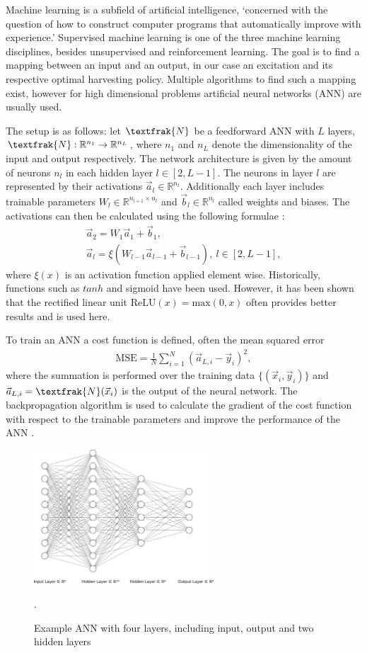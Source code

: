 Machine learning is a subfield of artificial intelligence, `concerned with the question of how to construct computer programs that automatically improve with experience.' \cite{Mitchell97}
Supervised machine learning is one of the three machine learning disciplines, besides unsupervised and reinforcement learning.
The goal is to find a mapping between an input and an output, in our case an excitation and its respective optimal harvesting policy.
Multiple algorithms to find such a mapping exist, however for high dimensional problems artificial neural networks (ANN) are usually used.

The setup is as follows: let $\textfrak{N}$ be a feedforward ANN with $L$ layers, $\textfrak{N}: \mathbb{R}^{n_1} \to \mathbb{R}^{n_L}$, where $n_1$ and $n_L$ denote the dimensionality of the input and output respectively.
The network architecture is given by the amount of neurons $n_l$ in each hidden layer $l \in [2, L - 1]$.
The neurons in layer $l$ are represented by their activations $\vec{a}_l \in \mathbb{R}^{n_l}$. Additionally each layer includes trainable parameters $W_l \in \mathbb{R}^{n_{l+1} \times n_{l}}$ and $\vec{b}_l \in \mathbb{R}^{n_l}$ called weights and biases.
The activations can then be calculated using the following formulae \cite{TN_libero_mab2)53517}:
\begin{align*}
	\vec{a}_2 = W_1 \vec{a}_1 + \vec{b}_1, \\
	\vec{a}_l = \xi(W_{l-1} \vec{a}_{l-1} + \vec{b}_{l-1}), \ l \in [2, L - 1],
\end{align*}
where $\xi(x)$ is an activation function applied element wise. Historically, functions such as $tanh$ and sigmoid have been used. However, it has been shown \cite{Maas2013RectifierNI} that the rectified linear unit $\mathrm{ReLU}(x) = \mathrm{max}(0, x)$ often provides better results and is used here.

To train an ANN a cost function is defined, often the mean squared error 
\begin{align*}
	\mathrm{MSE} = \frac{1}{N} \sum_{i=1}^N (\vec{a}_{L, i} - \vec{y}_i)^2,
\end{align*}
where the summation is performed over the training data $\{(\vec{x}_i, \vec{y}_i)\}$ and $\vec{a}_{L, i} = \textfrak{N}(\vec{x}_i)$ is the output of the neural network.
The backpropagation algorithm is used to calculate the gradient of the cost function with respect to the trainable parameters and improve the performance of the ANN \cite{rumelhart1986learning, nielsenneural}.

\begin{figure}
	\centering
	\includegraphics[width=0.6\textwidth]{img/nn}
	\caption{Example ANN with four layers, including input, output and two hidden layers \cite{LeNail2019}}.
	\label{nn}
\end{figure}